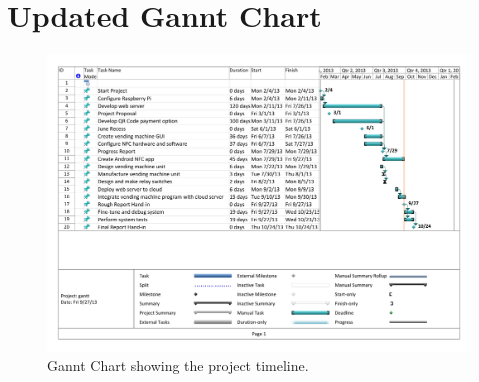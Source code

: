 \chapter{Updated Gannt Chart}
\label{app:c}

\begin{figure}
 \centering 
 \includegraphics[clip=true, trim = 0 0 0 0,
 scale=0.6]{gantt}
 \caption{Gannt Chart showing the project timeline.}
 \label{fig:gannt}
\end{figure}